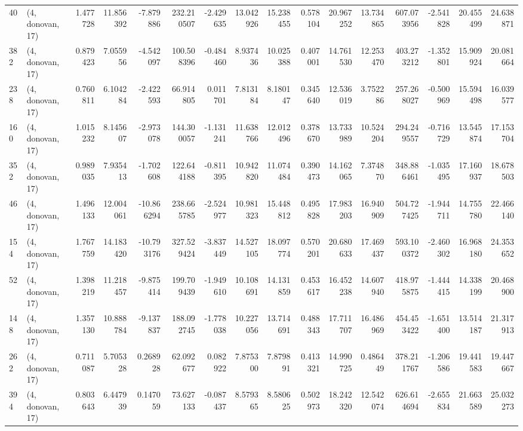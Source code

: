 \begin{tabular}{llrrrrrrrrrrrrrr}
40  &  (4, donovan, 17) &   1.477728 &  11.856392 &  -7.879886 &   232.210507 &  -2.429635 &  13.042926 &  15.238455 &  0.578104 &  20.967252 &  13.734865 &   607.073956 &  -2.541828 &  20.455499 &  24.638871 \\
382 &  (4, donovan, 17) &   0.879423 &   7.055956 &  -4.542097 &   100.508396 &  -0.484460 &   8.937436 &  10.025388 &  0.407001 &  14.761530 &  12.253470 &   403.273212 &  -1.352801 &  15.909924 &  20.081664 \\
238 &  (4, donovan, 17) &   0.760811 &   6.104284 &  -2.422593 &    66.914805 &   0.011701 &   7.813184 &   8.180147 &  0.345640 &  12.536019 &   3.752286 &   257.268027 &  -0.500969 &  15.594498 &  16.039577 \\
160 &  (4, donovan, 17) &   1.015232 &   8.145607 &  -2.973078 &   144.300057 &  -1.131241 &  11.638766 &  12.012496 &  0.378670 &  13.733989 &  10.524204 &   294.249557 &  -0.716729 &  13.545874 &  17.153704 \\
352 &  (4, donovan, 17) &   0.989035 &   7.935413 &  -1.702608 &   122.644188 &  -0.811395 &  10.942820 &  11.074484 &  0.390473 &  14.162065 &   7.374870 &   348.886461 &  -1.035495 &  17.160937 &  18.678503 \\
46  &  (4, donovan, 17) &   1.496133 &  12.004061 & -10.866294 &   238.665785 &  -2.524977 &  10.981323 &  15.448812 &  0.495828 &  17.983203 &  16.940909 &   504.727425 &  -1.944711 &  14.755780 &  22.466140 \\
154 &  (4, donovan, 17) &   1.767759 &  14.183420 & -10.793176 &   327.529424 &  -3.837449 &  14.527105 &  18.097774 &  0.570201 &  20.680633 &  17.469437 &   593.100372 &  -2.460302 &  16.968180 &  24.353652 \\
52  &  (4, donovan, 17) &   1.398219 &  11.218457 &  -9.875414 &   199.709439 &  -1.949610 &  10.108691 &  14.131859 &  0.453617 &  16.452238 &  14.607940 &   418.975875 &  -1.444415 &  14.338199 &  20.468900 \\
148 &  (4, donovan, 17) &   1.357130 &  10.888784 &  -9.137837 &   188.092745 &  -1.778038 &  10.227056 &  13.714691 &  0.488343 &  17.711707 &  16.486969 &   454.453422 &  -1.651400 &  13.514187 &  21.317913 \\
262 &  (4, donovan, 17) &   0.711087 &   5.705328 &   0.268928 &    62.092677 &   0.082922 &   7.875300 &   7.879891 &  0.413321 &  14.990725 &   0.486449 &   378.211767 &  -1.206586 &  19.441583 &  19.447667 \\
394 &  (4, donovan, 17) &   0.803643 &   6.447939 &   0.147059 &    73.627133 &  -0.087437 &   8.579365 &   8.580625 &  0.502973 &  18.242320 &  12.542074 &   626.614694 &  -2.655834 &  21.663589 &  25.032273 \\

\end{tabular}

